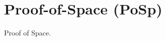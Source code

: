 \section{Proof-of-Space (PoSp)\label{methods}}
\begin{otherlanguage}{english}
Proof of Space.
\end{otherlanguage}